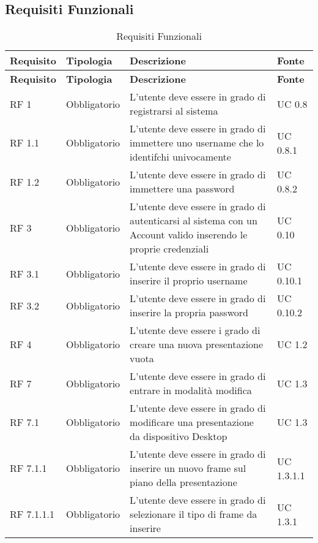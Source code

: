 \subsection{Requisiti Funzionali}{
	\renewcommand*{\arraystretch}{1.4}
	\begin{longtable} [c]{| p{2.5cm} | p{2.5cm} | p{6cm} |p{2.5cm}|}
		\caption{Requisiti Funzionali \label{tab:reqFunzionali}}\\
	 \hline
	 \textbf{Requisito} & \textbf{Tipologia} & \textbf{Descrizione} & \textbf{Fonte} \\
	 \hline
	 \endfirsthead
	 \hline
	 \textbf{Requisito} & \textbf{Tipologia} & \textbf{Descrizione} & \textbf{Fonte} \\
	 \hline
			\endhead
	 \hline
	 \endfoot
	 \hline
	 \endlastfoot
		RF 1 & Obbligatorio & L'utente deve essere in grado di registrarsi al sistema & UC 0.8\\
		\hline
		RF 1.1 & Obbligatorio & L'utente deve essere in grado di immettere uno username che lo identifchi univocamente & UC 0.8.1\\
		\hline
		RF 1.2 & Obbligatorio & L'utente deve essere in grado di immettere una password & UC 0.8.2\\
		\hline
		RF 3 & Obbligatorio & L'utente deve essere in grado di autenticarsi al sistema con un Account\ped{g} valido inserendo le proprie credenziali & UC 0.10\\
		\hline
		RF 3.1 & Obbligatorio & L'utente deve essere in grado di inserire il proprio username & UC 0.10.1\\		
		\hline
		RF 3.2 & Obbligatorio & L'utente deve essere in grado di inserire la propria password & UC 0.10.2\\
		\hline
		RF 4 & Obbligatorio & L’utente deve essere i grado di creare una nuova presentazione vuota & UC 1.2\\
		\hline	
		RF 7 & Obbligatorio & L'utente deve essere in grado di entrare in modalità modifica & UC 1.3\\
		\hline
		RF 7.1 & Obbligatorio & L'utente deve essere in grado di modificare una presentazione da dispositivo Desktop\ped{g} & UC 1.3\\						
		\hline
		RF 7.1.1 & Obbligatorio & L'utente deve essere in grado di inserire un nuovo frame\ped{g} sul piano della presentazione\ped{g} & UC 1.3.1.1\\
		\hline
		RF 7.1.1.1 & Obbligatorio & L'utente deve essere in grado di selezionare il tipo di frame\ped{g} da inserire & UC 1.3.1\\

\end{longtable}}
